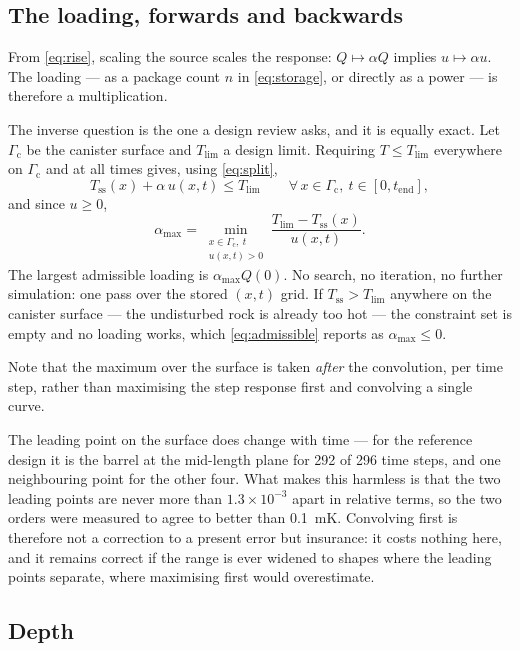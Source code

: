 \documentclass[11pt,a4paper]{article}
\theoremstyle{plain}
\newcommand{\Tss}{T_{\mathrm{ss}}}
\newcommand{\Tlim}{T_{\mathrm{lim}}}
\begin{document}
\subsection{The loading, forwards and backwards}

From \eqref{eq:rise}, scaling the source scales the response: $Q \mapsto \alpha
Q$ implies $u \mapsto \alpha u$. The loading --- as a package count $n$ in
\eqref{eq:storage}, or directly as a power --- is therefore a multiplication.

The inverse question is the one a design review asks, and it is equally exact.
Let $\Gamma_{\mathrm{c}}$ be the canister surface and $\Tlim$ a design limit.
Requiring $T \le \Tlim$ everywhere on $\Gamma_{\mathrm{c}}$ and at all times
gives, using \eqref{eq:split},
\[
  \Tss(x) + \alpha\, u(x,t) \le \Tlim
  \qquad \forall\, x \in \Gamma_{\mathrm{c}},\ t \in [0, t_{\mathrm{end}}],
\]
and since $u \ge 0$,
\begin{equation}
  \boxed{\;
  \alpha_{\max}
    = \min_{\substack{x \in \Gamma_{\mathrm{c}},\ t \\ u(x,t) > 0}}
      \frac{\Tlim - \Tss(x)}{u(x,t)} . \;}
  \label{eq:admissible}
\end{equation}
The largest admissible loading is $\alpha_{\max} Q(0)$. No search, no
iteration, no further simulation: one pass over the stored
$(x,t)$ grid. If $\Tss > \Tlim$ anywhere on the canister surface --- the
undisturbed rock is already too hot --- the constraint set is empty and no
loading works, which \eqref{eq:admissible} reports as $\alpha_{\max} \le 0$.

Note that the maximum over the surface is taken \emph{after} the convolution,
per time step, rather than maximising the step response first and convolving a
single curve.

The leading point on the surface does change with time --- for the reference
design it is the barrel at the mid-length plane for 292 of 296 time steps, and
one neighbouring point for the other four. What makes this harmless is that the
two leading points are never more than $1.3\times10^{-3}$ apart in relative
terms, so the two orders were measured to agree to better than
\SI{0.1}{\milli\kelvin}. Convolving first is therefore not a correction to a
present error but insurance: it costs nothing here, and it remains correct if
the range is ever widened to shapes where the leading points separate, where
maximising first would overestimate.

\subsection{Depth}
\end{document}
